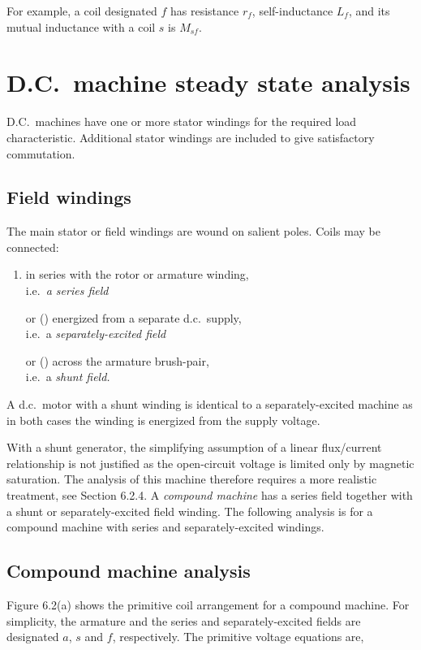 \documentclass[a4paper,numbers=noenddot,12pt]{scrbook}
\begin{document}
        For example, a coil designated $f$ has resistance $r_f$, self-inductance $L_f$, and its mutual inductance with a coil $s$ is $M_{sf}$.

        \section{D.C.\ machine steady state analysis}
        D.C.\ machines have one or more stator windings for the required load characteristic. Additional stator windings are included to give satisfactory commutation.

        \subsection{Field windings}
        The main stator or field windings are wound on salient poles. Coils may be connected:
        \begin{enumerate}
            \item in series with the rotor or armature winding, \\
                i.e.\ \textit{a series field}
            \item[or \stepcounter{enumi} (\alph{enumi})] energized from a separate d.c.\ supply, \\
                i.e.\ a \textit{separately-excited field}
            \item[or \stepcounter{enumi} (\alph{enumi})] across the armature brush-pair,\\
                i.e.\ a \textit{shunt field.}
        \end{enumerate}
        A d.c.\ motor with a shunt winding is identical to a separately-excited machine as in both cases the winding is energized from the supply voltage.

        With a shunt generator, the simplifying assumption of a linear flux/current relationship is not justified as the open-circuit voltage is limited only by magnetic saturation. The analysis of this machine therefore requires a more realistic treatment, see Section 6.2.4.
        A \textit{compound machine} has a series field together with a shunt or separately-excited field winding. The following analysis is for a compound machine with series and separately-excited windings.
        \subsection{Compound machine analysis}
        Figure 6.2(a) shows the primitive coil arrangement for a compound machine. For simplicity, the armature and the series and separately-excited fields are designated $a$, $s$ and $f$, respectively. The primitive voltage equations are,
\end{document}
